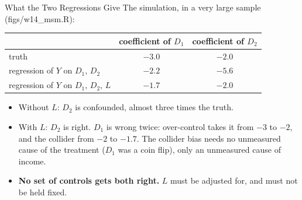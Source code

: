 \documentclass[aspectratio=169,11pt,xcolor=dvipsnames]{beamer}
\newcommand{\srcp}[1]{{\scriptsize\color{gray}(#1)}}
\begin{document}
\begin{frame}{What the Two Regressions Give}
The simulation, in a very large sample \srcp{figs/w14\_msm.R}:
\begin{center}
\renewcommand{\arraystretch}{1.25}
\begin{tabular}{@{}lcc@{}}
\toprule
 & coefficient of $D_1$ & coefficient of $D_2$ \\
\midrule
truth & $-3.0$ & $-2.0$ \\
regression of $Y$ on $D_1$, $D_2$ & $-2.2$ & \alert{$-5.6$} \\
regression of $Y$ on $D_1$, $D_2$, $L$ & \alert{$-1.7$} & $-2.0$ \\
\bottomrule
\end{tabular}
\end{center}
\begin{itemize}\itemsep5pt
  \item Without $L$: $D_2$ is confounded, almost three times the truth.
  \item With $L$: $D_2$ is right. $D_1$ is wrong twice: over-control takes it from $-3$ to
        $-2$, and the collider from $-2$ to $-1.7$. The collider bias needs no unmeasured cause of
        the treatment ($D_1$ was a coin flip), only an unmeasured cause of income.
  \item \textbf{No set of controls gets both right.} $L$ must be adjusted for, and must not be held
        fixed.
\end{itemize}
\end{frame}
\end{document}
